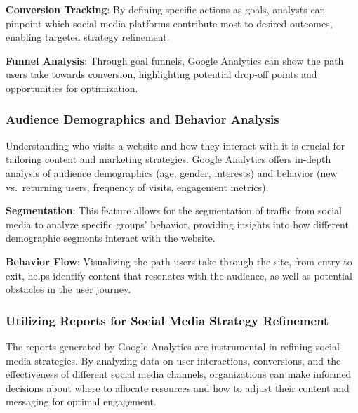 \documentclass[
]{book}
\begin{document}
\textbf{Conversion Tracking}: By defining specific actions as goals, analysts can pinpoint which social media platforms contribute most to desired outcomes, enabling targeted strategy refinement.

\textbf{Funnel Analysis}: Through goal funnels, Google Analytics can show the path users take towards conversion, highlighting potential drop-off points and opportunities for optimization.

\hypertarget{audience-demographics-and-behavior-analysis}{%
\subsubsection*{Audience Demographics and Behavior Analysis}\label{audience-demographics-and-behavior-analysis}}

Understanding who visits a website and how they interact with it is crucial for tailoring content and marketing strategies. Google Analytics offers in-depth analysis of audience demographics (age, gender, interests) and behavior (new vs.~returning users, frequency of visits, engagement metrics).

\textbf{Segmentation}: This feature allows for the segmentation of traffic from social media to analyze specific groups' behavior, providing insights into how different demographic segments interact with the website.

\textbf{Behavior Flow}: Visualizing the path users take through the site, from entry to exit, helps identify content that resonates with the audience, as well as potential obstacles in the user journey.

\hypertarget{utilizing-reports-for-social-media-strategy-refinement}{%
\subsubsection*{Utilizing Reports for Social Media Strategy Refinement}\label{utilizing-reports-for-social-media-strategy-refinement}}

The reports generated by Google Analytics are instrumental in refining social media strategies. By analyzing data on user interactions, conversions, and the effectiveness of different social media channels, organizations can make informed decisions about where to allocate resources and how to adjust their content and messaging for optimal engagement.
\end{document}
